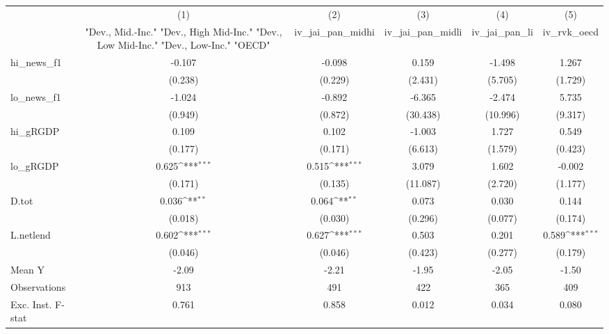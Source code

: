 {
\def\sym#1{\ifmmode^{#1}\else\(^{#1}\)\fi}
\begin{tabular}{l*{5}{c}}
\toprule
            &\multicolumn{1}{c}{(1)}&\multicolumn{1}{c}{(2)}&\multicolumn{1}{c}{(3)}&\multicolumn{1}{c}{(4)}&\multicolumn{1}{c}{(5)}\\
            &\multicolumn{1}{c}{ "Dev., Mid.-Inc." "Dev., High Mid-Inc." "Dev., Low Mid-Inc." "Dev., Low-Inc." "OECD" }&\multicolumn{1}{c}{iv\_jai\_pan\_midhi}&\multicolumn{1}{c}{iv\_jai\_pan\_midli}&\multicolumn{1}{c}{iv\_jai\_pan\_li}&\multicolumn{1}{c}{iv\_rvk\_oecd}\\
\midrule
hi\_news\_f1  &      -0.107         &      -0.098         &       0.159         &      -1.498         &       1.267         \\
            &     (0.238)         &     (0.229)         &     (2.431)         &     (5.705)         &     (1.729)         \\
\addlinespace
lo\_news\_f1  &      -1.024         &      -0.892         &      -6.365         &      -2.474         &       5.735         \\
            &     (0.949)         &     (0.872)         &    (30.438)         &    (10.996)         &     (9.317)         \\
\addlinespace
hi\_gRGDP    &       0.109         &       0.102         &      -1.003         &       1.727         &       0.549         \\
            &     (0.177)         &     (0.171)         &     (6.613)         &     (1.579)         &     (0.423)         \\
\addlinespace
lo\_gRGDP    &       0.625\sym{***}&       0.515\sym{***}&       3.079         &       1.602         &      -0.002         \\
            &     (0.171)         &     (0.135)         &    (11.087)         &     (2.720)         &     (1.177)         \\
\addlinespace
D.tot       &       0.036\sym{**} &       0.064\sym{**} &       0.073         &       0.030         &       0.144         \\
            &     (0.018)         &     (0.030)         &     (0.296)         &     (0.077)         &     (0.174)         \\
\addlinespace
L.netlend   &       0.602\sym{***}&       0.627\sym{***}&       0.503         &       0.201         &       0.589\sym{***}\\
            &     (0.046)         &     (0.046)         &     (0.423)         &     (0.277)         &     (0.179)         \\
\midrule
Mean Y      &       -2.09         &       -2.21         &       -1.95         &       -2.05         &       -1.50         \\
Observations&         913         &         491         &         422         &         365         &         409         \\
Exc. Inst. F-stat&       0.761         &       0.858         &       0.012         &       0.034         &       0.080         \\
\bottomrule
\end{tabular}
}
